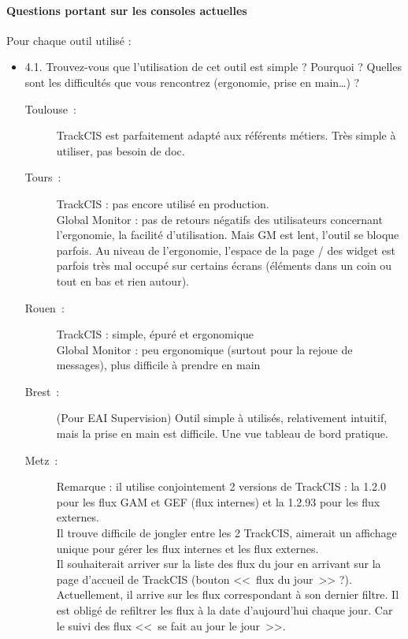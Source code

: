 	\paragraph{Questions portant sur les consoles actuelles}
	Pour chaque outil utilisé :
	\begin{itemize}
	  \item 4.1. Trouvez-vous que l’utilisation de cet outil est simple ? Pourquoi
	  ? Quelles sont les difficultés que vous rencontrez (ergonomie, prise en main…) ?
	  \begin{description}
	  	\item[Toulouse~:] TrackCIS est parfaitement adapté aux référents métiers.
	  	Très simple à utiliser, pas besoin de doc.
	  	\item[Tours~:] TrackCIS : pas encore utilisé en production.\\
		Global Monitor : pas de retours négatifs des utilisateurs concernant
		l’ergonomie, la facilité d’utilisation. Mais GM est lent, l’outil se bloque
		parfois. Au niveau de l’ergonomie, l’espace de la page / des widget est parfois
		très mal occupé sur certains écrans (éléments dans un coin ou tout en bas et
		rien autour).
	  	\item[Rouen~:] TrackCIS : simple, épuré et ergonomique\\
		Global Monitor : peu ergonomique (surtout pour la rejoue de messages), plus
		difficile à prendre en main
	  	\item[Brest~:] (Pour EAI Supervision) Outil simple à utilisés, relativement
	  	intuitif, mais la prise en main est difficile. Une vue tableau de bord pratique.
	  	\item[Metz~:] Remarque : il utilise conjointement 2 versions de TrackCIS :
	  	la 1.2.0 pour les flux GAM et GEF (flux internes) et la 1.2.93 pour les
	  	flux externes.\\
	  	Il trouve difficile de jongler entre les 2 TrackCIS, aimerait un affichage
	  	unique pour gérer les flux internes et les flux externes.\\
		Il souhaiterait arriver sur la liste des flux du jour en arrivant sur la page
		d’accueil de TrackCIS (bouton <<~flux du jour~>> ?). Actuellement, il arrive
		sur les flux correspondant à son dernier filtre. Il est obligé de refiltrer les
		flux à la date d’aujourd’hui chaque jour. Car le suivi des flux <<~se fait au
		jour le jour~>>.
	  \end{description}
	  

\end{itemize}
